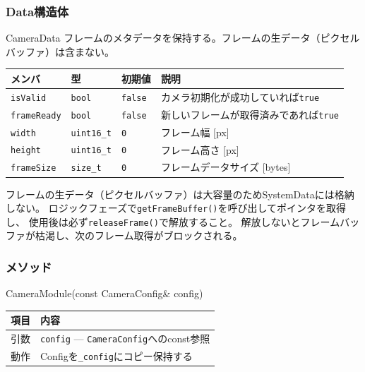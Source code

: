 \subsubsection{Data構造体}

\begin{funcblock}{CameraData}
フレームのメタデータを保持する。フレームの生データ（ピクセルバッファ）は含まない。

\begin{longtable}{l l l p{4.8cm}}
\toprule
\textbf{メンバ} & \textbf{型} & \textbf{初期値} & \textbf{説明} \\
\midrule
\endhead
\texttt{isValid}    & \texttt{bool}     & \texttt{false} & カメラ初期化が成功していれば\texttt{true} \\
\texttt{frameReady} & \texttt{bool}     & \texttt{false} & 新しいフレームが取得済みであれば\texttt{true} \\
\texttt{width}      & \texttt{uint16\_t} & \texttt{0}    & フレーム幅 [px] \\
\texttt{height}     & \texttt{uint16\_t} & \texttt{0}    & フレーム高さ [px] \\
\texttt{frameSize}  & \texttt{size\_t}  & \texttt{0}     & フレームデータサイズ [bytes] \\
\bottomrule
\end{longtable}
\end{funcblock}

\begin{cautionbox}[フレームデータのアクセス方法]
フレームの生データ（ピクセルバッファ）は大容量のためSystemDataには格納しない。
ロジックフェーズで\texttt{getFrameBuffer()}を呼び出してポインタを取得し、
使用後は必ず\texttt{releaseFrame()}で解放すること。
解放しないとフレームバッファが枯渇し、次のフレーム取得がブロックされる。
\end{cautionbox}

\subsubsection{メソッド}

\begin{funcblock}{CameraModule(const CameraConfig\& config)}
\begin{tabularx}{\textwidth}{l X}
\toprule
\textbf{項目} & \textbf{内容} \\
\midrule
引数   & \texttt{config} --- \texttt{CameraConfig}へのconst参照 \\
動作   & Configを\texttt{\_config}にコピー保持する \\
\bottomrule
\end{tabularx}
\end{funcblock}

